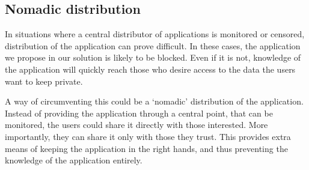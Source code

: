 \subsection{Nomadic distribution}
In situations where a central distributor of applications is monitored or censored, distribution of the application can prove difficult.
In these cases, the application we propose in our solution is likely to be blocked.
Even if it is not, knowledge of the application will quickly reach those who desire access to the data the users want to keep private.

A way of circumventing this could be a `nomadic' distribution of the application.
Instead of providing the application through a central point, that can be monitored, the users could share it directly with those interested.
More importantly, they can share it only with those they trust.
This provides extra means of keeping the application in the right hands, and thus preventing the knowledge of the application entirely.  